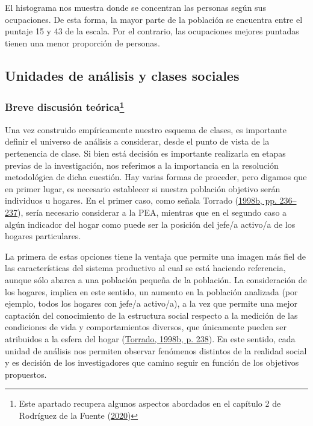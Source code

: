 \documentclass[
]{article}
\begin{document}
El histograma nos muestra donde se concentran las personas según sus ocupaciones. De esta forma, la mayor parte de la población se encuentra entre el puntaje 15 y 43 de la escala. Por el contrario, las ocupaciones mejores puntadas tienen una menor proporción de personas.

\hypertarget{unidades}{%
\subsection{Unidades de análisis y clases sociales}\label{unidades}}

\hypertarget{breve-discusiuxf3n-teuxf3rica}{%
\subsubsection[Breve discusión teórica]{\texorpdfstring{Breve discusión teórica\footnote{Este apartado recupera algunos aspectos abordados en el capítulo 2 de Rodríguez de la Fuente (\protect\hyperlink{ref-RodriguezdelaFuente2020}{2020})}}{Breve discusión teórica}}\label{breve-discusiuxf3n-teuxf3rica}}

Una vez construido empíricamente nuestro esquema de clases, es importante definir el universo de análisis a considerar, desde el punto de vista de la pertenencia de clase. Si bien está decisión es importante realizarla en etapas previas de la investigación, nos referimos a la importancia en la resolución metodológica de dicha cuestión. Hay varias formas de proceder, pero digamos que en primer lugar, es necesario establecer si nuestra población objetivo serán individuos u hogares. En el primer caso, como señala Torrado (\protect\hyperlink{ref-Torrado1998d}{1998b, pp. 236--237}), sería necesario considerar a la PEA, mientras que en el segundo caso a algún indicador del hogar como puede ser la posición del jefe/a activo/a de los hogares particulares.

La primera de estas opciones tiene la ventaja que permite una imagen más fiel de las características del sistema productivo al cual se está haciendo referencia, aunque sólo abarca a una población pequeña de la población. La consideración de los hogares, implica en este sentido, un aumento en la población analizada (por ejemplo, todos los hogares con jefe/a activo/a), a la vez que permite una mejor captación del conocimiento de la estructura social respecto a la medición de las condiciones de vida y comportamientos diversos, que únicamente pueden ser atribuidos a la esfera del hogar (\protect\hyperlink{ref-Torrado1998d}{Torrado, 1998b, p. 238}). En este sentido, cada unidad de análisis nos permiten observar fenómenos distintos de la realidad social y es decisión de los investigadores que camino seguir en función de los objetivos propuestos.
\end{document}
